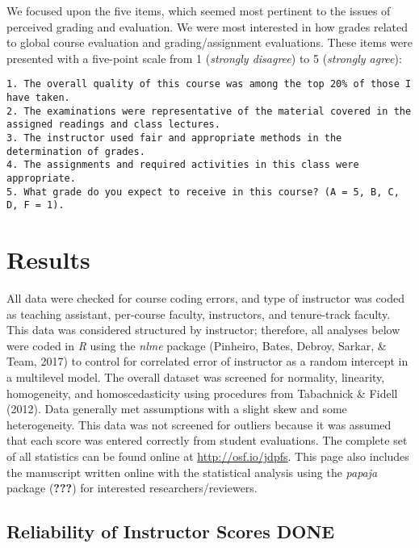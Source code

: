 \documentclass[man]{apa6}
\theoremstyle{definition}
\theoremstyle{definition}
\theoremstyle{definition}
\theoremstyle{remark}
\begin{document}
We focused upon the five items, which seemed most pertinent to the
issues of perceived grading and evaluation. We were most interested in
how grades related to global course evaluation and grading/assignment
evaluations. These items were presented with a five-point scale from 1
(\emph{strongly disagree}) to 5 (\emph{strongly agree}):

\begin{verbatim}
1. The overall quality of this course was among the top 20% of those I have taken. 
2. The examinations were representative of the material covered in the assigned readings and class lectures. 
3. The instructor used fair and appropriate methods in the determination of grades. 
4. The assignments and required activities in this class were appropriate. 
5. What grade do you expect to receive in this course? (A = 5, B, C, D, F = 1).
\end{verbatim}

\section{Results}\label{results}

All data were checked for course coding errors, and type of instructor
was coded as teaching assistant, per-course faculty, instructors, and
tenure-track faculty. This data was considered structured by instructor;
therefore, all analyses below were coded in \emph{R} using the
\emph{nlme} package (Pinheiro, Bates, Debroy, Sarkar, \& Team, 2017) to
control for correlated error of instructor as a random intercept in a
multilevel model. The overall dataset was screened for normality,
linearity, homogeneity, and homoscedasticity using procedures from
Tabachnick \& Fidell (2012). Data generally met assumptions with a
slight skew and some heterogeneity. This data was not screened for
outliers because it was assumed that each score was entered correctly
from student evaluations. The complete set of all statistics can be
found online at \url{http://osf.io/jdpfs}. This page also includes the
manuscript written online with the statistical analysis using the
\emph{papaja} package ({\textbf{???}}) for interested
researchers/reviewers.

\subsection{Reliability of Instructor Scores
DONE}\label{reliability-of-instructor-scores-done}
\end{document}
